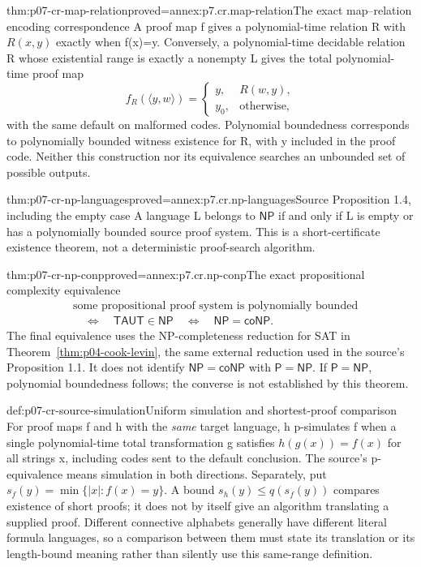 \begin{hbtheorem}{thm:p07-cr-map-relation}{proved=annex:p7.cr.map-relation}{The exact map--relation encoding correspondence}
A proof map f gives a polynomial-time relation R with
\(R(x,y)\) exactly when f(x)=y. Conversely, a polynomial-time
decidable relation R whose existential range is exactly a nonempty L
gives the total polynomial-time proof map
\[
 f_R(\langle y,w\rangle)=
 \begin{cases}y,&R(w,y),\\ y_0,&\text{otherwise},\end{cases}
\]
with the same default on malformed codes. Polynomial boundedness
corresponds to polynomially bounded witness existence for R, with y
included in the proof code. Neither this construction nor its
equivalence searches an unbounded set of possible outputs.
\end{hbtheorem}

\begin{hbtheorem}{thm:p07-cr-np-languages}{proved=annex:p7.cr.np-languages}{Source Proposition 1.4, including the empty case}
A language L belongs to \(\mathsf{NP}\) if and only if L is empty
or has a polynomially bounded source proof system. This is a
short-certificate existence theorem, not a deterministic proof-search
algorithm.
\end{hbtheorem}

\begin{hbtheorem}{thm:p07-cr-np-conp}{proved=annex:p7.cr.np-conp}{The exact propositional complexity equivalence}
\[
\begin{aligned}
 &\text{some propositional proof system is polynomially bounded}\\
 &\quad\Longleftrightarrow\quad \mathsf{TAUT}\in\mathsf{NP}
 \quad\Longleftrightarrow\quad\mathsf{NP}=\mathsf{coNP}.
\end{aligned}
\]
The final equivalence uses the NP-completeness reduction for SAT in
Theorem~\ref{thm:p04-cook-levin}, the same external reduction used
in the source's Proposition 1.1. It does not identify
\(\mathsf{NP}=\mathsf{coNP}\) with \(\mathsf P=\mathsf{NP}\).
If \(\mathsf P=\mathsf{NP}\), polynomial boundedness follows;
the converse is not established by this theorem.
\end{hbtheorem}

\begin{hbdefinition}{def:p07-cr-source-simulation}{Uniform simulation and shortest-proof comparison}
For proof maps f and h with the \emph{same} target language, h
p-simulates f when a single polynomial-time total transformation g
satisfies \(h(g(x))=f(x)\) for all strings x, including codes sent
to the default conclusion. The source's p-equivalence means simulation
in both directions. Separately, put
\(s_f(y)=\min\{|x|:f(x)=y\}\). A bound
\(s_h(y)\leq q(s_f(y))\) compares existence of short proofs;
it does not by itself give an algorithm translating a supplied proof.
Different connective alphabets generally have different literal formula
languages, so a comparison between them must state its translation or
its length-bound meaning rather than silently use this same-range definition.
\end{hbdefinition}

